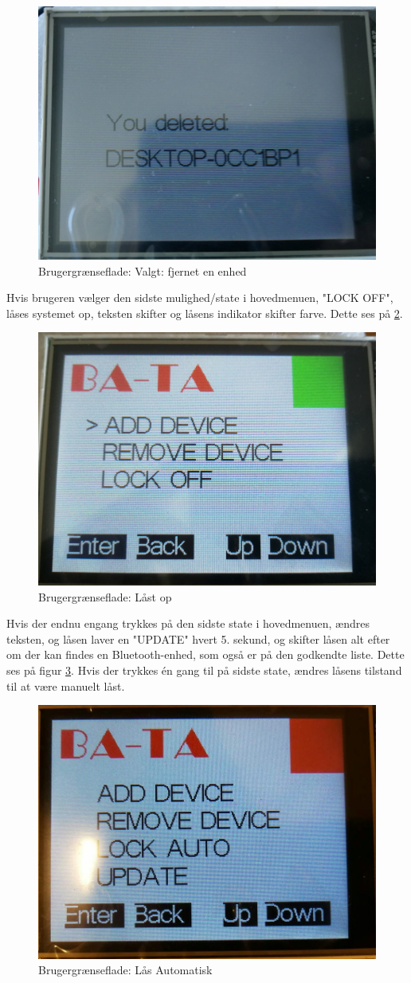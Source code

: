 \begin{figure}[H]
	\centering
	\includegraphics[width = 300 pt]{Img/delete.jpg}
	\caption{Brugergrænseflade: Valgt: fjernet en enhed}
	\label{fig:delete}
\end{figure}
Hvis brugeren vælger den sidste mulighed/state i hovedmenuen, "LOCK OFF", låses systemet op, teksten skifter og låsens indikator skifter farve. Dette ses på \ref{fig:lockOff}.
\begin{figure}[H]
	\centering
	\includegraphics[width = 300 pt]{Img/lockOff.jpg}
	\caption{Brugergrænseflade: Låst op}
	\label{fig:lockOff}
\end{figure}
\newpage
Hvis der endnu engang trykkes på den sidste state i hovedmenuen, ændres teksten, og låsen laver en "UPDATE"  hvert 5. sekund, og skifter låsen alt efter om der kan findes en Bluetooth-enhed, som også er på den godkendte liste. Dette ses på figur \ref{fig:auto}. Hvis der trykkes én gang til på sidste state, ændres låsens tilstand til at være manuelt låst.
\begin{figure}[H]
	\centering
	\includegraphics[width = 300 pt]{Img/auto.jpg}
	\caption{Brugergrænseflade: Lås Automatisk}
	\label{fig:auto}
\end{figure}

